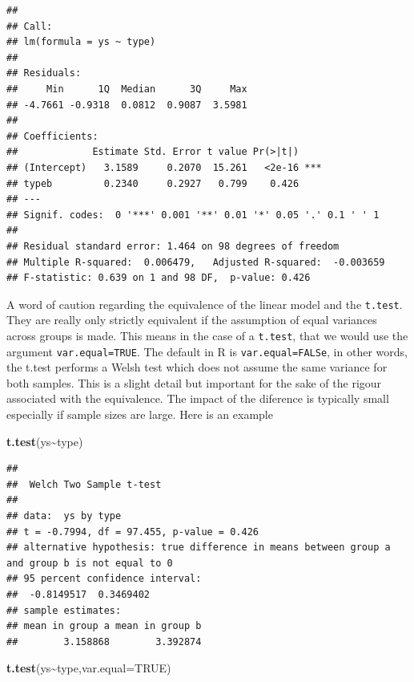 \documentclass[
]{book}
\newenvironment{Shaded}{\begin{snugshade}}{\end{snugshade}}
\newcommand{\AttributeTok}[1]{\textcolor[rgb]{0.13,0.29,0.53}{#1}}
\newcommand{\ConstantTok}[1]{\textcolor[rgb]{0.56,0.35,0.01}{#1}}
\newcommand{\FunctionTok}[1]{\textcolor[rgb]{0.13,0.29,0.53}{\textbf{#1}}}
\newcommand{\NormalTok}[1]{#1}
\newcommand{\SpecialCharTok}[1]{\textcolor[rgb]{0.81,0.36,0.00}{\textbf{#1}}}
\begin{document}
\begin{verbatim}
## 
## Call:
## lm(formula = ys ~ type)
## 
## Residuals:
##     Min      1Q  Median      3Q     Max 
## -4.7661 -0.9318  0.0812  0.9087  3.5981 
## 
## Coefficients:
##             Estimate Std. Error t value Pr(>|t|)    
## (Intercept)   3.1589     0.2070  15.261   <2e-16 ***
## typeb         0.2340     0.2927   0.799    0.426    
## ---
## Signif. codes:  0 '***' 0.001 '**' 0.01 '*' 0.05 '.' 0.1 ' ' 1
## 
## Residual standard error: 1.464 on 98 degrees of freedom
## Multiple R-squared:  0.006479,   Adjusted R-squared:  -0.003659 
## F-statistic: 0.639 on 1 and 98 DF,  p-value: 0.426
\end{verbatim}

A word of caution regarding the equivalence of the linear model and the \texttt{t.test}. They are really only strictly equivalent if the assumption of equal variances across groups is made. This means in the case of a \texttt{t.test}, that we would use the argument \texttt{var.equal=TRUE}. The default in R is \texttt{var.equal=FALSe}, in other words, the t.test performs a Welsh test which does not assume the same variance for both samples. This is a slight detail but important for the sake of the rigour associated with the equivalence. The impact of the diference is typically small especially if sample sizes are large. Here is an example

\begin{Shaded}
\begin{Highlighting}[]
\FunctionTok{t.test}\NormalTok{(ys}\SpecialCharTok{\textasciitilde{}}\NormalTok{type)}
\end{Highlighting}
\end{Shaded}

\begin{verbatim}
## 
##  Welch Two Sample t-test
## 
## data:  ys by type
## t = -0.7994, df = 97.455, p-value = 0.426
## alternative hypothesis: true difference in means between group a and group b is not equal to 0
## 95 percent confidence interval:
##  -0.8149517  0.3469402
## sample estimates:
## mean in group a mean in group b 
##        3.158868        3.392874
\end{verbatim}

\begin{Shaded}
\begin{Highlighting}[]
\FunctionTok{t.test}\NormalTok{(ys}\SpecialCharTok{\textasciitilde{}}\NormalTok{type,}\AttributeTok{var.equal=}\ConstantTok{TRUE}\NormalTok{)}
\end{Highlighting}
\end{Shaded}
\end{document}
